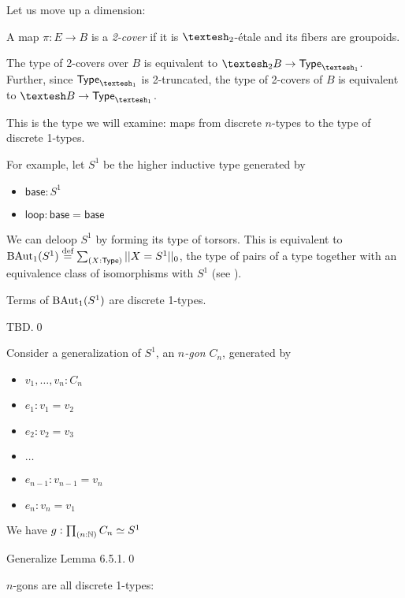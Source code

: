\documentclass[12pt]{article}
\begin{document}
Let us move up a dimension:

\begin{mydef}
  A map \(\pi:E\to B\) is a \emph{2-cover} if it is \(\shapet\)-étale and its fibers are groupoids.
\end{mydef}

\begin{mylemma}
  The type of 2-covers over \(B\) is equivalent to \(\shapet B \to \Typeo\). Further, since \(\Typeo\) is 2-truncated, the type of 2-covers of \(B\) is equivalent to \(\shape B\to \Typeo\).
\end{mylemma}

This is the type we will examine: maps from discrete \( n \)-types to the type of discrete 1-types.

For example, let \(S^1\) be the higher inductive type generated by
\begin{itemize}
\item \( \mathsf{base}:S^1 \)
\item \( \mathsf{loop}:\mathsf{base}=\mathsf{base} \)
\end{itemize}

We can deloop \(S^1\) by forming its type of torsors. This is equivalent to \(\mathrm{BAut}_1(S^1)\stackrel{\textup{def}}{=}\sum_{(X:\mathsf{Type})}||X=S^1||_0\), the type of pairs of a type together with an equivalence class of isomorphisms with \( S^1 \) (see \cite{buchholtz2023central}). 

\begin{mylemma}Terms of \( \mathrm{BAut}_1(S^1) \) are discrete 1-types.\end{mylemma}\proof TBD.\qed

Consider a generalization of \( S^1 \),  an \emph{\( n \)-gon} \( C_n \), generated by
\begin{itemize}
\item \( v_1,\ldots,v_n:C_n \)
\item \( e_1:v_1=v_2\)
\item \( e_2:v_2=v_3 \)
\item \( \ldots \) 
\item \(e_{n-1}:v_{n-1}=v_n\)
\item \(e_n:v_n=v_1 \)
\end{itemize}

\begin{mylemma}
  We have \( g:\prod_{(n:\mathbb{N})}C_n\simeq S^1 \)
\end{mylemma}
\proof Generalize \cite{hottbook} Lemma 6.5.1.\qed

\( n \)-gons are all discrete 1-types:
\end{document}
